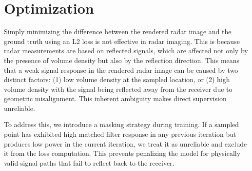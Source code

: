 \section{Optimization}
\label{sec:opt}

Simply minimizing the difference between the rendered radar image and the ground truth using an L2 loss is not effective in radar imaging.
This is because radar measurements are based on reflected signals, which are affected not only by the presence of volume density but also by the reflection direction.
This means that a weak signal response in the rendered radar image can be caused by two distinct factors:
(1) low volume density at the sampled location, or
(2) high volume density with the signal being reflected away from the receiver due to geometric misalignment.
This inherent ambiguity makes direct supervision unreliable.

To address this, we introduce a masking strategy during training.
If a sampled point has exhibited high matched filter response in any previous iteration but produces low power in the current iteration, we treat it as unreliable and exclude it from the loss computation.
This prevents penalizing the model for physically valid signal paths that fail to reflect back to the receiver.
